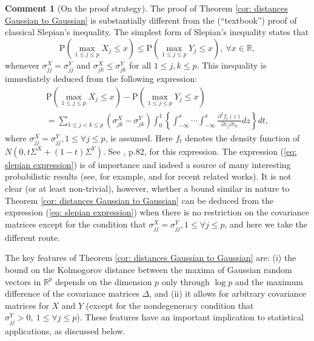 \documentclass[11pt,reqno]{amsart}
\theoremstyle{definition}
\newtheorem{remark}{Comment}
\renewcommand{\Pr}{{\mathrm{P}}}
\newcommand{\RR}{\mathbb{R}}
\begin{document}
\begin{remark}[On the proof strategy]
The proof of Theorem \ref{cor: distances Gaussian to Gaussian} is substantially different from the (``textbook'') proof of classical Slepian's inequality. The simplest form of Slepian's inequality states that
\begin{equation*}
\Pr ( \max_{1 \leq j \leq p} X_{j} \leq x) \leq \Pr ( \max_{1 \leq j \leq p} Y_{j} \leq x), \ \forall x \in \RR,
\end{equation*}
whenever $\sigma_{jj}^{X} = \sigma_{jj}^{Y}$ and $\sigma_{jk}^{X} \leq \sigma_{jk}^{Y}$ for all $1 \leq j,k \leq p$.
This inequality is immediately deduced from the following expression:
\begin{multline}
\Pr ( \max_{1 \leq j \leq p} X_{j}\leq x ) -\Pr ( \max_{1 \leq j \leq p} Y_{j}\leq x ) \\
= \sum_{1 \leq j < k \leq p} (\sigma_{jk}^{X} - \sigma_{jk}^{Y}) \int_{0}^{1} \left \{ \int_{-\infty}^{x} \cdots \int_{-\infty}^{x} \frac{\partial^{2} f_{t}(z)}{\partial z_{j}\partial z_{k}} dz \right \} dt, \label{eq: slepian expression}
\end{multline}
where $\sigma_{jj}^{X}  = \sigma_{jj}^{Y},1 \leq \forall j \leq p$,  is assumed. Here $f_{t}$ denotes the density function of $N(0,t \Sigma^{X} + (1-t) \Sigma^{Y})$. See \cite{Leadbetter1983}, p.82, for this expression.
The expression (\ref{eq: slepian expression}) is of  importance and indeed a source of many interesting probabilistic results (see, for example, \cite{LS02} and \cite{Y09} for recent related works).
It is not clear (or at least non-trivial), however,  whether a bound similar in nature to Theorem \ref{cor: distances Gaussian to Gaussian} can be deduced from the expression (\ref{eq: slepian expression}) when there is no restriction on the covariance matrices except for the condition that $\sigma_{jj}^{X}  = \sigma_{jj}^{Y},1 \leq \forall j \leq p$, and here we take the different route.
\end{remark}

The key features of Theorem \ref{cor: distances Gaussian to Gaussian} are: (i) the bound on the Kolmogorov distance between the maxima of Gaussian random vectors in $\RR^{p}$ depends on the dimension $p$ only through  $\log p$ and the maximum difference of the covariance matrices $\Delta$, and (ii) it allows for arbitrary covariance matrices for $X$ and $Y$ (except for the nondegeneracy condition that $\sigma_{jj}^{Y} > 0, \ 1 \leq \forall j \leq p$). These features have an important implication to statistical applications, as discussed below.
\end{document}
